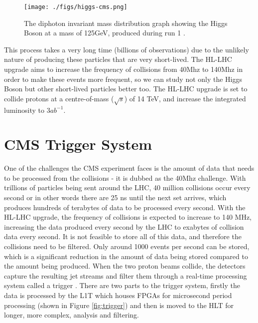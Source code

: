 \documentclass[a4paper]{article}
\theoremstyle{plain}
\theoremstyle{definition}
\begin{document}
	\begin{figure}[htbp]
		\centering
		\texttt{[image: ./figs/higgs-cms.png]}
		\small\caption{The diphoton invariant mass distribution graph showing the Higgs Boson at a mass of 125GeV, produced during run 1 \cite{higgs-cms}.}
		\label{fig:higgs}
	\end{figure}
	
    This process takes a very long time (billions of observations) due to the unlikely nature of producing these particles that are very short-lived. The HL-LHC upgrade aims to increase the frequency of collisions from 40Mhz to 140Mhz in order to make these events more frequent, so we can study not only the Higgs Boson but other short-lived particles better too. The HL-LHC upgrade is set to collide protons at a centre-of-mass ($\sqrt{s}$) of 14 TeV, and increase the integrated luminosity to $3 ab^{-1}$. 
	
	\section{CMS Trigger System}
	\label{sec:trigger}
	
	One of the challenges the CMS experiment faces is the amount of data that needs to be processed from the collisions - it is dubbed as the 40Mhz challenge. With trillions of particles being sent around the LHC, 40 million collisions occur every second or in other words there are 25 ns until the next set arrives, which produces hundreds of terabytes of data to be processed every second.  With the HL-LHC upgrade, the frequency of collisions is expected to increase to 140 MHz, increasing the data produced every second by the LHC to exabytes of collision data every second. It is not feasible to store all of this data, and therefore the collisions need to be filtered. Only around 1000 events per second can be stored, which is a significant reduction in the amount of data being stored compared to the amount being produced. When the two proton beams collide, the detectors capture the resulting jet streams and filter them through a real-time processing system called a trigger \cite{trigger-system}. There are two parts to the trigger system, firstly the data is processed by the L1T which houses FPGAs for microsecond period processing (shown in Figure \ref{fig:trigger}) and then is moved to the HLT for longer, more complex, analysis and filtering. 
	
\end{document}
